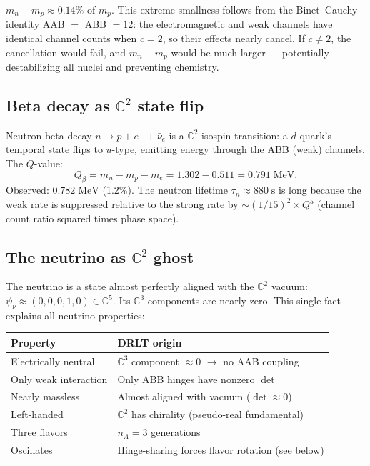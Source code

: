 \begin{remark}
$m_n - m_p \approx 0.14\%$ of $m_p$. This extreme smallness follows from the Binet--Cauchy identity AAB $=$ ABB $= 12$: the electromagnetic and weak channels have identical channel counts when $c = 2$, so their effects nearly cancel. If $c \neq 2$, the cancellation would fail, and $m_n - m_p$ would be much larger --- potentially destabilizing all nuclei and preventing chemistry.
\end{remark}

\subsection{Beta decay as $\mathbb{C}^2$ state flip}

Neutron beta decay $n \to p + e^- + \bar{\nu}_e$ is a $\mathbb{C}^2$ isospin transition: a $d$-quark's temporal state flips to $u$-type, emitting energy through the ABB (weak) channels. The $Q$-value:
\begin{equation}
Q_\beta = m_n - m_p - m_e = 1.302 - 0.511 = 0.791\;\text{MeV}.
\end{equation}
Observed: $0.782\;\text{MeV}$ (1.2\%). The neutron lifetime $\tau_n \approx 880\;\text{s}$ is long because the weak rate is suppressed relative to the strong rate by $\sim(1/15)^2 \times Q^5$ (channel count ratio squared times phase space).

\subsection{The neutrino as $\mathbb{C}^2$ ghost}

The neutrino is a state almost perfectly aligned with the $\mathbb{C}^2$ vacuum: $\psi_\nu \approx (0, 0, 0, 1, 0) \in \mathbb{C}^5$. Its $\mathbb{C}^3$ components are nearly zero. This single fact explains all neutrino properties:

\begin{center}
\begin{tabular}{ll}
\hline
Property & DRLT origin \\
\hline
Electrically neutral & $\mathbb{C}^3$ component $\approx 0$ $\to$ no AAB coupling \\
Only weak interaction & Only ABB hinges have nonzero $\det$ \\
Nearly massless & Almost aligned with vacuum ($\det \approx 0$) \\
Left-handed & $\mathbb{C}^2$ has chirality (pseudo-real fundamental) \\
Three flavors & $n_A = 3$ generations \\
Oscillates & Hinge-sharing forces flavor rotation (see below) \\
\hline
\end{tabular}
\end{center}

